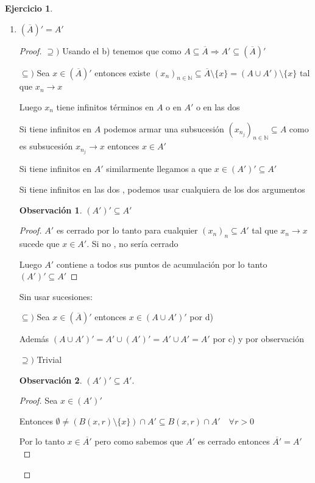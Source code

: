 \documentclass[12pt]{report}
\newcommand{\N}{\mathbb{N}}
\newcommand{\Ra}{\Rightarrow}
\newcommand{\ra}{\rightarrow}
\newcommand{\ol}{\overline}
\theoremstyle{definition}
\newtheorem*{remark}{Observación}
\newtheorem{ej}{Ejercicio}
\begin{document}
\begin{ej}
\begin{enumerate}
\begin{enumerate}
\begin{proof}
	Si $x \notin B(x,r) \cap A\quad \forall r>0$ entonces $\emptyset \neq B(x,r) \cap A = (B(x,r)\setminus \{x\}) \cap A$

	Por lo tanto $x \in A'$ luego $x \in A \cup A'$
	  \end{proof}
	\item $(\ol A)' = A'$
	  \begin{proof}
	$\supseteq )$ Usando el b) tenemos que como $A \subseteq \ol A \Ra A' \subseteq (\ol A)'$

      $\subseteq )$ Sea $x \in (\ol A)'$ entonces existe $(x_n)_{n\in \N} \subseteq \ol A \setminus \{x\}= (A \cup A') \setminus \{x\}$ tal que $x_n \ra x$

    Luego $x_{n}$ tiene infinitos términos en $A$ o en $A'$ o en las dos

  Si tiene infinitos en $A$ podemos armar una subsucesión $(x_{n_{j}})_{n\in \N} \subseteq A$ como es subsucesión $x_{n_j} \ra x$ entonces $x \in A'$

Si tiene infinitos en $A'$ similarmente llegamos a que $x \in (A')' \subseteq A'$

Si tiene infinitos en las dos , podemos usar cualquiera de los dos argumentos

\begin{remark}
 $(A')'\subseteq A'$ 
 \begin{proof}
 $A'$ es cerrado por lo tanto para cualquier $(x_{n})_n \subseteq A'$ tal que $x_n \ra x$ sucede que $x \in A'$. Si no , no sería cerrado 

Luego $A'$ contiene a todos sus puntos de acumulación por lo tanto $(A')' \subseteq A'$
 \end{proof} 
\end{remark}

	Sin usar sucesiones:

	$\subseteq )$ Sea $x \in ( \ol A)'$ entonces $x \in (A\cup A ')'$ por d)

	Además $(A \cup A')'= A'\cup (A') ' = A'\cup A'= A '$ por c) y por observación 

	$\supseteq ) $ Trivial
	\begin{remark}
		$(A') '\subseteq A'$. 
		\begin{proof}
			Sea $x \in (A') '$ 

			Entonces $\emptyset \neq (B(x,r)\setminus\{x\})\cap A'\subseteq B(x,r) \cap A'\quad \forall r>0$ 

			Por lo tanto $x \in \ol{A'}$ pero como sabemos que $A'$ es cerrado entonces $\ol{A'} = A'$


\end{proof}
\end{remark}
\end{proof}
\end{enumerate}
\end{enumerate}
\end{ej}
\end{document}
